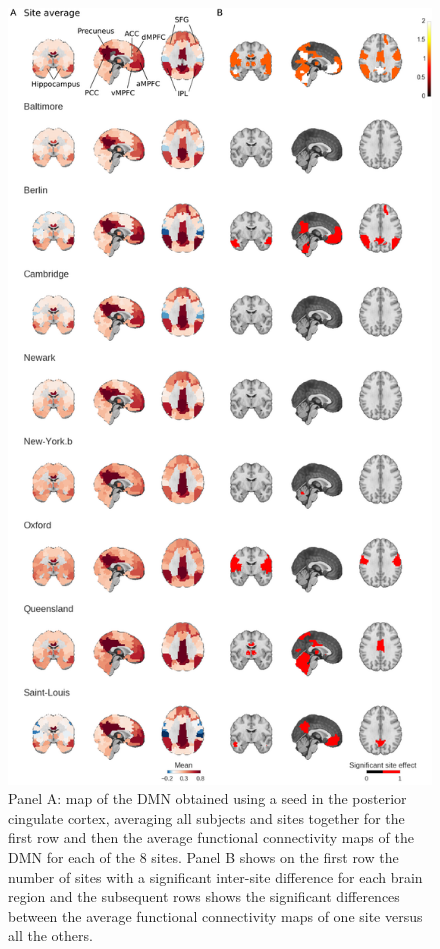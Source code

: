 \documentclass[authoryear]{elsarticle}
\begin{document}
\begin{figure}[htbp]
\begin{center}
\includegraphics[width=0.8\linewidth]{../figures/dmn_multisite.png}
\end{center}
\caption[DMN variability across sites]{
Panel A: map of the DMN obtained using a seed in the posterior cingulate cortex, averaging all subjects and sites together for the first row and then the average functional connectivity maps of the DMN for each of the 8 sites. Panel B shows on the first row the number of sites with a significant inter-site difference for each brain region and the subsequent rows shows the significant differences between the average functional connectivity maps of one site versus all the others.
}
\label{fig_DMN_variability}
\end{figure}
\end{document}
